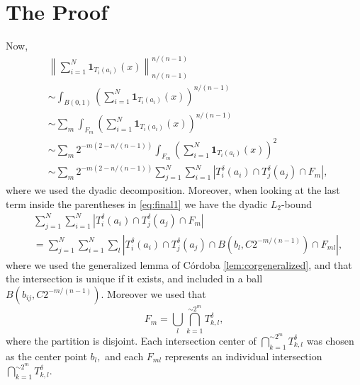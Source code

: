 \documentclass[11pt, letterpaper]{nyjm}
\begin{document}
\section{The Proof}


Now, 
\begin{equation} \label{eq:final1}
	\begin{aligned}	
		&\left\| \sum_{i=1}^{N} \mathbf{1}_{T_i(a_i)}(x)
		\right\|_{n/(n-1)}^{n/(n-1)} \\
		&\sim \int_{B(0,1)}(\sum_{i=1}^{N} \mathbf{1}_{T_i(a_i)}(x))^{n/(n-1)} \\
		&\sim \sum_m \int_{F_m}(\sum_{i=1}^{N} \mathbf{1}_{T_i(a_i)}(x))^{n/(n-1)} \\
		&\sim \sum_m 2^{-m(2-n/(n-1))}\int_{F_m}(\sum_{i=1}^{N} \mathbf{1}_{T_i(a_i)}(x))^{2} \\
		&\sim \sum_m 2^{-m(2-n/(n-1))}\sum_{j=1}^{N}\sum_{i=1}^{N}|T^\delta_i(a_i) \cap T^\delta_j(a_j) \cap F_m|, 
	\end{aligned}
\end{equation} 
where we used the dyadic decomposition.
Moreover, when looking at the last term inside the parentheses in \eqref{eq:final1} we have the dyadic $L_2$-bound 
\begin{equation} \label{eq:final2}
	\begin{aligned}	
		&\sum_{j=1}^{N}\sum_{i=1}^{N}|T^\delta_i(a_i) \cap T^\delta_j(a_j) \cap F_m| \\
		& = \sum_{j=1}^{N}\sum_{i=1}^{N} \sum_{l}|T^\delta_i(a_i) \cap T^\delta_j(a_j)\cap B(b_{l},C2^{-m/(n-1)}) \cap F_{ml}|
		,
	\end{aligned}
\end{equation}
where we used the generalized lemma of C{\'o}rdoba \ref{lem:corgeneralized}, and that the intersection is unique if it exists, and included in a ball $B(b_{ij},C2^{-m/(n-1)}).$ Moreover we used that   
\[
F_m = \bigcup_l\bigcap_{k=1}^{\sim 2^m} T_{k,l}^{\delta}, 
\]
where the partition is disjoint.
Each intersection center of  $\bigcap_{k=1}^{\sim 2^m} T_{k,l}^{\delta}$ was chosen as the center point $b_{l},$ and each $F_{ml}$ represents an individual intersection $\bigcap_{k=1}^{\sim 2^m} T_{k,l}^{\delta}.$ 
\end{document}
